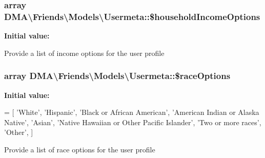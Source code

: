 \subsubsection[{\$household\+Income\+Options}]{\setlength{\rightskip}{0pt plus 5cm}array D\+M\+A\textbackslash{}\+Friends\textbackslash{}\+Models\textbackslash{}\+Usermeta\+::\$household\+Income\+Options\hspace{0.3cm}{\ttfamily [static]}}\label{classDMA_1_1Friends_1_1Models_1_1Usermeta_a0578ccf8e50b07c1a6ec66118671d7a3}
{\bfseries Initial value\+:}
\begin{DoxyCode}
= [
        \textcolor{stringliteral}{'Less then $25,000'},
        \textcolor{stringliteral}{'$25,000 - $50,000'},
        \textcolor{stringliteral}{'$50,000 - $75,000'},
        \textcolor{stringliteral}{'$75,000 - $150,000'},
        \textcolor{stringliteral}{'$150,000 - $500,000'},
        \textcolor{stringliteral}{'$500,000 or more'},
    ]
\end{DoxyCode}
Provide a list of income options for the user profile \hypertarget{classDMA_1_1Friends_1_1Models_1_1Usermeta_adcfe27bcb392a9cdab20c59e612a0d7a}{}
\subsubsection[{\$race\+Options}]{\setlength{\rightskip}{0pt plus 5cm}array D\+M\+A\textbackslash{}\+Friends\textbackslash{}\+Models\textbackslash{}\+Usermeta\+::\$race\+Options\hspace{0.3cm}{\ttfamily [static]}}\label{classDMA_1_1Friends_1_1Models_1_1Usermeta_adcfe27bcb392a9cdab20c59e612a0d7a}
{\bfseries Initial value\+:}
\begin{DoxyCode}
= [
        \textcolor{stringliteral}{'White'},
        \textcolor{stringliteral}{'Hispanic'},
        \textcolor{stringliteral}{'Black or African American'},
        \textcolor{stringliteral}{'American Indian or Alaska Native'},
        \textcolor{stringliteral}{'Asian'},
        \textcolor{stringliteral}{'Native Hawaiian or Other Pacific Islander'},
        \textcolor{stringliteral}{'Two or more races'},
        \textcolor{stringliteral}{'Other'},
    ]
\end{DoxyCode}
Provide a list of race options for the user profile \hypertarget{classDMA_1_1Friends_1_1Models_1_1Usermeta_a085486010d2c88f8676ac2e4fdbc257d}{}
